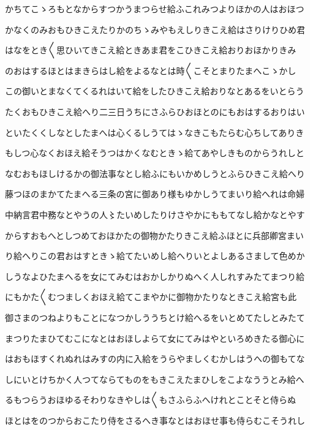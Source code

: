 \documentclass[a4paper,11pt,landscape]{ltjtarticle}
\begin{document}
\par\medskip
かちてこゝろもとなからすつかうまつらせ給ふこれみつよりほかの人はおほつ
\par\medskip
かなくのみおもひきこえたりかのちゝみやもえしりきこえ給はさりけりひめ君
\par\medskip
はなをとき〱思ひいてきこえ給ときあま君をこひきこえ給おりおほかりきみ
\par\medskip
のおはするほとはまきらはし給をよるなとは時〱こそとまりたまへこゝかし
\par\medskip
この御いとまなくてくるれはいて給をしたひきこえ給おりなとあるをいとらう
\par\medskip
たくおもひきこえ給へり二三日うちにさふらひおほとのにもおはするおりはい
\par\medskip
といたくくしなとしたまへは心くるしうてはゝなきこもたらむ心ちしてありき
\par\medskip
もしつ心なくおほえ給そうつはかくなむときゝ給てあやしきものからうれしと
\par\medskip
なむおもほしけるかの御法事なとし給ふにもいかめしうとふらひきこえ給へり
\par\medskip
藤つほのまかてたまへる三条の宮に御あり様もゆかしうてまいり給へれは命婦
\par\medskip
中納言君中務なとやうの人〻たいめしたりけさやかにももてなし給かなとやす
\par\medskip
からすおもへとしつめておほかたの御物かたりきこえ給ふほとに兵部卿宮まい
\par\medskip
り給へりこの君おはすときゝ給てたいめし給へりいとよしあるさまして色めか
\par\medskip
しうなよひたまへるを女にてみむはおかしかりぬへく人しれすみたてまつり給
\par\medskip
にもかた〱むつましくおほえ給てこまやかに御物かたりなときこえ給宮も此
\par\medskip
御さまのつねよりもことになつかしううちとけ給へるをいとめてたしとみたて
\par\medskip
まつりたまひてむこになとはおほしよらて女にてみはやといろめきたる御心に
\par\medskip
はおもほすくれぬれはみすの内に入給をうらやましくむかしはうへの御もてな
\par\medskip
しにいとけちかく人つてならてものをもきこえたまひしをこよなううとみ給へ
\par\medskip
るもつらうおほゆるそわりなきやしは〱もさふらふへけれとことそと侍らぬ
\par\medskip
ほとはをのつからおこたり侍をさるへき事なとはおほせ事も侍らむこそうれし
\par\medskip
\end{document}
